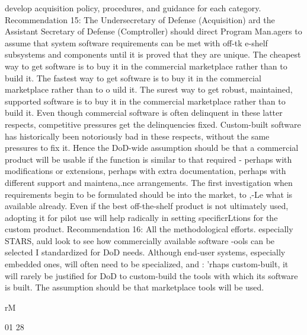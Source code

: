 \documentclass[12pt]{article}
\begin{document}
develop acquisition policy, procedures, and guidance for each category.
Recommendation 15: The Undersecretary of Defense (Acquisition) ard the
Assistant Secretary of Defense (Comptroller) should direct Program Man.agers
to assume that system software requirements can be met with off-tk e-shelf
subsystems and components until it is proved that they are unique.
The cheapest way to get software is to buy it in the commercial marketplace rather
than to build it.
The fastest way to get software is to buy it in the commercial marketplace rather than
to o uild it.
The surest way to get robust, maintained, supported software is to buy it in the
commercial marketplace rather than to build it.
Even though commercial software is often delinquent in these latter respects, competitive pressures get the delinquencies fixed. Custom-built software has historically been
notoriously bad in these respects, without the same pressures to fix it.
Hence the DoD-wide assumption should be that a commercial product will be usable if
the function is similar to that required - perhaps with modifications or extensions, perhaps
with extra documentation, perhaps with different support and maintena,.nce arrangements.
The first investigation when requirements begin to be formulated should be into the market,
to ,-Le what is available already. Even if the best off-the-shelf product is not ultimately
used, adopting it for pilot use will help radically in setting specificrLtions for the custom
product.
Recommendation 16: All the methodological efforts. especially STARS,
auld look to see how commercially available software -ools can be selected
I standardized for DoD needs.
Although end-user systems, especially embedded ones, will often need to be specialized,
and : 'rhaps custom-built, it will rarely be justified for DoD to custom-build the tools with
which its software is built. The assumption should be that marketplace tools will be used.

rM

01
28
\end{document}
